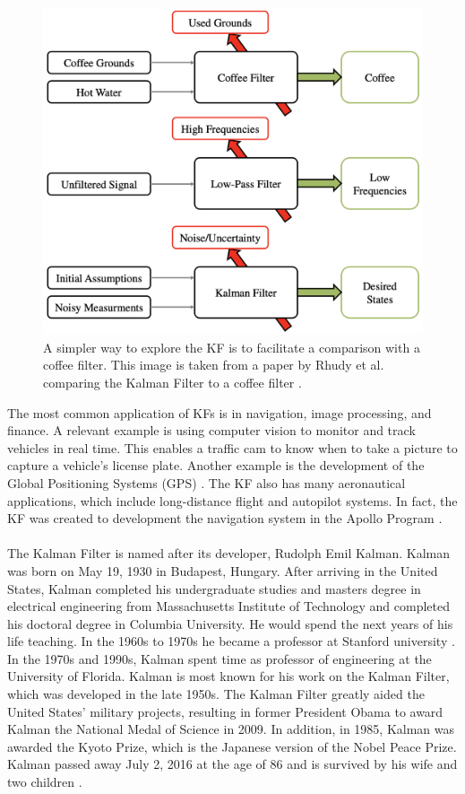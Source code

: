 \begin{figure}[h]
    \centering
    \includegraphics[scale = 0.4]{coffee.png}
    \caption{A simpler way to explore the KF is to facilitate a comparison with a coffee filter. This image is taken from a paper by Rhudy et al. comparing the Kalman Filter to a coffee filter \cite{article7}.}
    \end{figure}

\newpage

\noindent The most common application of KFs is in navigation, image processing, and finance. A relevant example is using computer vision to monitor and track vehicles in real time. This enables a traffic cam to know when to take a picture to capture a vehicle's license plate. Another example is the development of the Global Positioning Systems (GPS) \cite{lim_ong_lim_koo_2016}. The KF also has many aeronautical applications, which include long-distance flight and autopilot systems. In fact, the KF was created to development the navigation system in the Apollo Program \cite{kalmanbio}.  \\ \\


\noindent The Kalman Filter is named after its developer, Rudolph Emil Kalman. Kalman was born on May 19, 1930 in Budapest, Hungary. After arriving in the United States, Kalman completed his undergraduate studies and masters degree in electrical engineering from Massachusetts Institute of Technology and completed his doctoral degree in Columbia University. He would spend the next years of his life teaching. In the 1960s to 1970s he became a professor at Stanford university \cite{kalmanbio}. In the 1970s and 1990s, Kalman spent time as professor of  engineering at the University of Florida. Kalman is most known for his work on the Kalman Filter, which was developed in the late 1950s. The Kalman Filter greatly aided the United States' military projects, resulting in former President Obama to award Kalman the National Medal of Science in 2009. In addition, in 1985, Kalman was awarded the Kyoto Prize, which is the Japanese version of the Nobel Peace Prize. Kalman passed away July 2, 2016 at the age of 86 and is survived by his wife and two children \cite{Kalman_bio}. 

